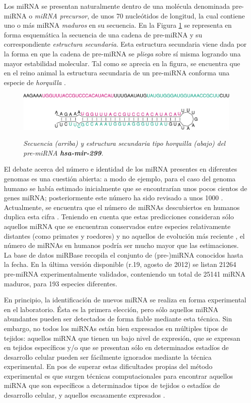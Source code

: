 \documentclass[12pt,bibliography=oldstyle,DIV=14,parskip=full-,titlepage]{scrartcl}
\begin{document}
Los miRNA se presentan naturalmente dentro de una molécula denominada
pre-miRNA o \emph{miRNA precursor}, de unos 70 nucleótidos de
longitud, la cual contiene uno o más miRNA \emph{maduros} en su
secuencia. En la Figura \ref{horquilla} se representa en forma
esquemática la secuencia de una cadena de pre-miRNA y su
correspondiente \emph{estructura secundaria}. Esta estructura
secundaria viene dada por la forma en que la cadena de pre-miRNA se
\emph{pliega} sobre sí misma logrando una mayor estabilidad
molecular. Tal como se aprecia en la figura, se encuentra que en el
reino animal la estructura secundaria de un pre-miRNA conforma una
especie de \emph{horquilla} \cite{bartel116}\cite{sewer}.
\begin{figure}[H]
\smallskip\small\slshape\center
  \includegraphics[width=.85\textwidth]{res/hsa-mir-299_ss.pdf}
  \caption{\small\slshape Secuencia
    (arriba) y estructura secundaria tipo horquilla (abajo) del
    pre-miRNA \textbf{hsa-mir-299}.  }
  \label{horquilla}
\end{figure}

El debate acerca del número e identidad de los miRNA presentes en
diferentes genomas es una cuestión abierta: a modo de ejemplo, para el
caso del genoma humano se había estimado inicialmente que se
encontrarían unos pocos cientos de genes miRNA; posteriormente este
número ha sido revisado a unos 1000 \cite{sewer}\cite{chang}.
Actualmente, se encuentra que el número de miRNAs descubiertos en
humanos duplica esta cifra \cite{gomes}.  Teniendo en cuenta que estas
predicciones consideran sólo aquellos miRNA que se encuentran
conservados entre especies relativamente distantes (como primates y
roedores) y no aquellos de evolución más reciente \cite{sewer}, el
número de miRNAs en humanos podría ser mucho mayor que las
estimaciones. La base de datos miRBase \cite{mirbase2}\cite{mirbase3}
recopila el conjunto de (pre-)miRNA conocidos hasta la
fecha. En la última versión disponible (r.19, agosto de 2012) se listan
21264 pre-miRNA experimentalmente validados, conteniendo un total de
25141 miRNA maduros, para 193 especies diferentes.
%

En principio, la identificación de nuevos miRNA se realiza en forma
experimental en el laboratorio. Ésta es la primera elección, pero sólo
aquellos miRNA abundantes pueden ser detectados de forma fiable
mediante esta técnica. Sin embargo, no todos los miRNAs están bien
expresados en múltiples tipos de tejidos: aquellos miRNA que tienen un
bajo nivel de expresión, que se expresan en tejidos específicos y/o
que se presentan sólo en determinados estadíos de desarrollo celular
pueden ser fácilmente ignorados mediante la técnica
experimental\cite{ding}\cite{xu}.  En pos de superar estas
dificultades propias del método experimental es que surgen técnicas
computacionales para encontrar aquellos miRNA que son específicos a
determinados tipos de tejidos o estadíos de desarrollo celular, y
aquellos escasamente expresados \cite{sheng}\cite{xu}.
\end{document}
